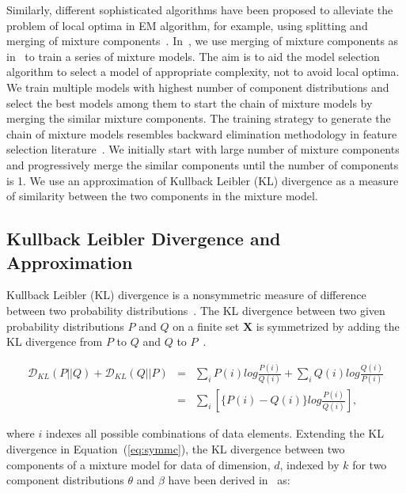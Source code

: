 Similarly, different sophisticated algorithms have been proposed to alleviate
the problem of local optima in EM algorithm, for example, using splitting and 
merging of mixture components~\cite{karciauskas2007,ueda2000}. In~, 
we use merging of mixture components as in~\cite{ueda2000} to train a series 
of mixture models. The aim is to aid the model selection algorithm to select 
a model of appropriate complexity, not to avoid local optima. We train multiple 
models with highest number of component distributions and select the best models
among them to start the chain of mixture models by merging the similar mixture
components. The training strategy to generate the chain of mixture models 
resembles  backward elimination methodology in feature 
selection literature~\cite{guyon2003}. We initially start 
with large number of mixture components and progressively 
merge the similar components until the number of components is 1.
We use an approximation of Kullback 
Leibler (KL) divergence as a measure of similarity between 
the two components in the mixture model.

\subsection{Kullback Leibler Divergence and Approximation}
\label{ss:approxKL}

Kullback Leibler (KL) divergence is a nonsymmetric measure of difference 
between two probability distributions~\cite{kullbackleibler51kl}. 
The KL divergence between two given probability distributions $P$ and $Q$ 
on a finite set $\boldsymbol{X}$ is symmetrized by adding the KL divergence 
from $P$ to $Q$ and $Q$ to $P$~\cite{juang85}. 

\begin{eqnarray}
  \label{eq:symmc}
  \mathcal{D}_{KL}(P||Q)+\mathcal{D}_{KL}(Q||P) & =  &\displaystyle\sum_{i} P(i) log  \frac{P(i)}{Q(i)}+\displaystyle\sum_{i} Q(i) log \frac{Q(i)}{P(i)}  \nonumber \\
  & = &\displaystyle\sum_{i} \left[ \{ P(i)-Q(i) \} log \frac{P(i)}{Q(i)}\right],
\end{eqnarray}

where $i$ indexes all possible combinations of data elements.
Extending the KL divergence in Equation~(\ref{eq:symmc}), the KL divergence between 
two components of a mixture model for data of dimension, $d$, indexed by $k$ 
for two component distributions $\theta$ and $\beta$ have been derived 
in~\cite{adhikari12ds} as:


